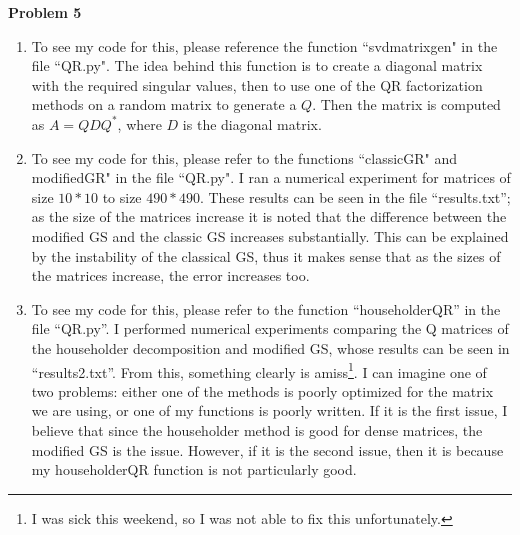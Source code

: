 \documentclass{article}
\newcommand{\Problem}[1]{\textbf{Problem #1}}
\begin{document}
\Problem{5}

\begin{enumerate}
\item To see my code for this, please reference the function ``svdmatrixgen" in the file ``QR.py". 
The idea behind this function is to create a diagonal matrix with the required singular values, then to use one of the QR factorization methods on a random matrix to generate a $Q$. 
Then the matrix is computed as $A = QDQ^*$, where $D$ is the diagonal matrix. 
\item To see my code for this, please refer to the functions ``classicGR" and modifiedGR" in the file ``QR.py". 
I ran a numerical experiment for matrices of size $10*10$ to size $490*490$.
These results can be seen in the file ``results.txt''; as the size of the matrices increase it is noted that the difference between the modified GS and the classic GS increases substantially. 
This can be explained by the instability of the classical GS, thus it makes sense that as the sizes of the matrices increase, the error increases too.
\item To see my code for this, please refer to the function ``householderQR'' in the file ``QR.py''. 
I performed numerical experiments comparing the Q matrices of the householder decomposition and modified GS, whose results can be seen in ``results2.txt''.
From this, something clearly is amiss\footnote{I was sick this weekend, so I was not able to fix this unfortunately. }.
I can imagine one of two problems: either one of the methods is poorly optimized for the matrix we are using, or one of my functions is poorly written.
If it is the first issue, I believe that since the householder method is good for dense matrices, the modified GS is the issue.
However, if it is the second issue, then it is because my householderQR function is not particularly good.
\end{enumerate}
\end{document}

